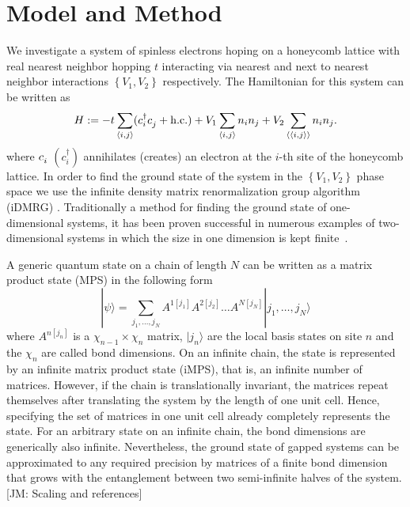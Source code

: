 \documentclass[aps,prx,10pt,twocolumn,floatfix,superscriptaddress,showpacs,numerical,footinbib]{revtex4-1}
\newcommand{\ket}[1]{| #1 \rangle}
\newcommand{\noteJM}[1]{{\color{red} [JM: #1]}}
\newcommand{\bs}[1]{{\boldsymbol{#1}}}
\begin{document}
\section{\label{sec:modandmeth}Model and Method}
%
We investigate a system of spinless electrons hoping on a honeycomb lattice with real nearest neighbor hopping $t$ interacting via nearest and next to nearest neighbor interactions 
$\left\lbrace V_{1},V_{2}\right\rbrace$ respectively. 
%
The Hamiltonian for this system can be written as
\begin{equation}
%
 H:=-t\sum_{\left\langle i,j\right\rangle}(c^{\dagger}_{i}c^{\vphantom{\dagger}}_{j}+ \mathrm{h.c.})+
V_{1}\sum_{\left\langle i,j\right\rangle }n_{i}n_{j}+
%
V_{2}\sum_{\left\langle \left\langle i,j\right\rangle \right\rangle }n_{i}n_{j}.
%
\label{eq:H}
\end{equation}
%
where $c_{i}^{\vphantom{\dagger}}$ $(c^{\dagger}_{i})$  annihilates (creates) an electron at the $i$-th site of the honeycomb lattice.
%
%
In order to find the ground state of the system in the $\left\lbrace V_{1},V_{2}\right\rbrace$ phase space
we use the infinite density matrix renormalization group algorithm (iDMRG) \cite{M08,W92,KZM13}.
%
Traditionally a method for finding the ground state of one-dimensional systems, it has been proven successful in numerous examples of two-dimensional systems in which the size in one dimension is kept finite~\cite{papers}. 

A generic quantum state on a chain of length $N$ can be written as a matrix product state (MPS) in the following form
%
\begin{equation}
%
 \ket{\psi} = \sum_{j_1, \ldots, j_N} A^{1 \left[j_1\right]} A^{2 \left[j_2\right]} \ldots A^{N \left[j_N\right]} \ket{j_1, \ldots, j_N}
\end{equation}
%
where $A^{n \left[j_n\right]}$ is a $\chi_{n-1} \times \chi_n$ matrix, $\ket{j_n}$ are the local basis states on site $n$ and the $\chi_n$ are called bond dimensions. 
%
On an infinite chain, the state is represented by an infinite matrix product state (iMPS), that is, an infinite number of matrices. 
%
However, if the chain is translationally invariant, the matrices repeat themselves after translating the system by the length of one unit cell. 
%
Hence, specifying the set of matrices in one unit cell already completely represents the state. 
%
For an arbitrary state on an infinite chain, the bond dimensions are generically also infinite. 
%
Nevertheless, the ground state of gapped systems can be approximated to any required precision by matrices of a finite bond dimension that grows with the entanglement between two semi-infinite halves of the system. \noteJM{Scaling and references}
\end{document}
